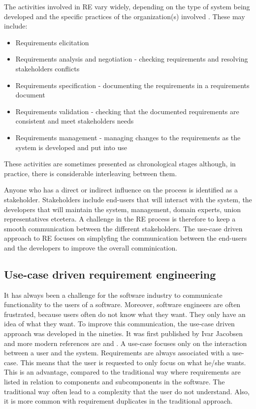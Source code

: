 The activities involved in RE vary widely, depending on the type of system being developed and the specific practices of the organization(s) involved  \cite{Som11}.  These may include:
\begin{itemize}
\item Requirements elicitation 
\item Requirements analysis and negotiation - checking requirements and resolving stakeholders conflicts
\item Requirements specification - documenting the requirements in a requirements document
\item Requirements validation - checking that the documented requirements are consistent and meet stakeholders needs
\item Requirements management - managing changes to the requirements as the system is developed and put into use
\end{itemize}

These activities are sometimes presented as chronological stages although, in practice, there is considerable interleaving between them.  

Anyone who has a direct or indirect influence on the process is identified as a stakeholder.   Stakeholders include end-users that will interact with the system, the developers that will maintain the system, management, domain experts, union representatives etcetera.  A challenge in the RE process is therefore to keep a smooth communication between the different stakeholders.  The use-case driven approach to RE focuses on simplyfing the communication between the end-users and the developers to improve the overall comminication.

\subsection{Use-case driven requirement engineering}
\label{sec:use-case-driven}
It has always been a challenge for the software industry to communicate functionality to the users of a software. Moreover, software engineers are often frustrated, because users often do not know what they want. They only have an idea of what they want.  To improve this communication, the use-case driven approach was developed in the nineties.  It was first published by Ivar Jacobsen \cite{Jac92} and more modern references are \cite{Poh10} and \cite{Coc01}.  A use-case focuses only on the interaction between a user and the system.  Requirements are always associated with a use-case. This means that the user is requested to only focus on what he/she wants.  This is an advantage, compared to the traditional way where requirements are listed in relation to components and subcomponents in the software.  The traditional way often lead to a complexity that the user do not understand.  Also, it is more common with requirement duplicates in the traditional approach.

